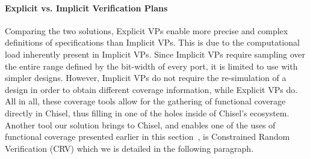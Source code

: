 \documentclass[conference]{IEEEtran}
\begin{document}
\paragraph{Explicit vs. Implicit Verification Plans}
Comparing the two solutions, Explicit VPs enable more precise and complex definitions of specifications than Implicit VPs.
This is due to the computational load inherently present in Implicit VPs. 
Since Implicit VPs require sampling over the entire range defined by the bit-width of every port, it is limited to use with simpler designs.
However, Implicit VPs do not require the re-simulation of a design in order to obtain different coverage information, while Explicit VPs do.
All in all, these coverage tools allow for the gathering of functional coverage directly in Chisel, thus filling in one of the holes inside of Chisel's ecosystem.
Another tool our solution brings to Chisel, and enables one of the uses of functional coverage presented earlier in this section~\cite{dobisFCFuzzing:WOSET2021}, is Constrained Random Verification (CRV) which we is detailed in the following paragraph.


\end{document}
